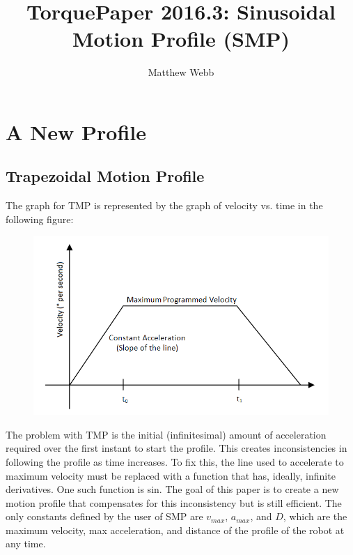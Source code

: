 \documentclass[a4paper,12pt]{report}
\author{Matthew Webb}
\title{TorquePaper 2016.3: Sinusoidal Motion Profile (SMP)}
\newcommand{\tab}{\hspace{20pt}}
\begin{document}
	\maketitle
	\tableofcontents
	
	\chapter{A New Profile}
	\section{Trapezoidal Motion Profile}
	\tab The graph for TMP is represented by the graph of velocity vs. time in the following figure:
	
	\begin{figure}[h]
		\centering
		\includegraphics[scale=.3]{tmp.png}
	\end{figure}
	
	\tab The problem with TMP is the initial (infinitesimal) amount of acceleration required over the first instant to start the profile. This creates inconsistencies in following the profile as time increases. To fix this, the line used to accelerate to maximum velocity must be replaced with a function that has, ideally, infinite derivatives. One such function is sin.
	\tab The goal of this paper is to create a new motion profile that compensates for this inconsistency but is still efficient. The only constants defined by the user of SMP are $v_{max}$, $a_{max}$, and $D$, which are the maximum velocity, max acceleration, and distance of the profile of the robot at any time.
	
\end{document}
